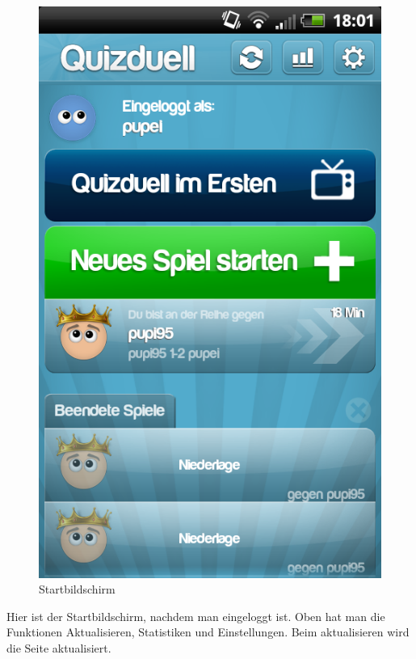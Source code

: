 \documentclass[fontsize=12pt,paper=a4,twoside]{scrartcl}
\begin{document}
\begin{figure}[H]
\centering
\includegraphics[scale=0.5]{Bilder/start.png}
\caption{Startbildschirm}
\end{figure}

Hier ist der Startbildschirm, nachdem man eingeloggt ist. Oben hat man die Funktionen Aktualisieren, Statistiken und Einstellungen. Beim aktualisieren wird die Seite aktualisiert. \\
\end{document}
